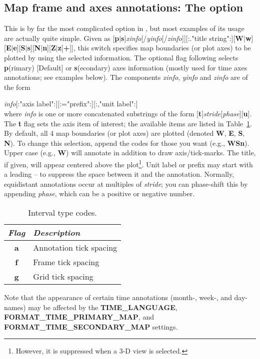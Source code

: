 \subsection{Map frame and axes annotations: The  option}
\label{sec:timeaxis}
This is by far the most complicated option in \GMT, but most examples
of its usage are actually quite simple.
Given as [\textbf{p}$|$\textbf{s}]\emph{xinfo}[/\emph{yinfo}[/\emph{zinfo}]][:."title
string":][\textbf{W}$|$\textbf{w}][\textbf{E}$|$\textbf{e}][\textbf{S}$|$\textbf{s}][\textbf{N}$|$\textbf{n}][\textbf{Z}$|$\textbf{z}[\textbf{+}]],
this switch specifies map boundaries (or plot axes) to be plotted by using the
selected information. The optional flag following  selects \textbf{p}(rimary) [Default] or \textbf{s}(econdary)
axes information (mostly used for time axes annotations; see examples below).
The components \emph{xinfo}, \emph{yinfo} and \emph{zinfo} are of the form \\

\par \emph{info}[:"axis label":][:="prefix":][:,"unit label":] \\

\noindent
where \emph{info} is one or more concatenated substrings of the form
[\textbf{t}]\emph{stride}[\emph{phase}][\textbf{u}].  The \textbf{t} flag sets the axis item of interest; the
available items are listed in Table~\ref{tbl:inttype}.  By
default, all 4 map boundaries (or plot axes) are plotted (denoted \textbf{W}, \textbf{E}, \textbf{S},
\textbf{N}).  To change this selection, append the codes for those you want
(e.g., \textbf{WSn}).  Upper case (e.g., \textbf{W}) will annotate in addition to
draw axis/tick-marks.  The title, if given, will appear centered above the plot\footnote{However,
it is suppressed when a 3-D view is selected.}.  Unit label or prefix may start with a
leading -- to suppress the space between it and the annotation.  Normally, equidistant annotations
occur at multiples of \emph{stride}; you can phase-shift this by appending \emph{phase}, which can be a
positive or negative number.
\begin{table}[H]
\centering
\begin{tabular}{|c|l|} \hline
\emph{Flag}	& \emph{Description} \\ \hline
\textbf{a}	&	Annotation tick spacing \\ \hline
\textbf{f}	&	Frame tick spacing \\ \hline
\textbf{g}	&	Grid tick spacing \\ \hline
\end{tabular}
\caption{Interval type codes.}
\label{tbl:inttype}
\end{table}
\noindent
Note that the appearance of certain time annotations (month-, week-, and day-names) may be affected
by the \textbf{TIME\_LANGUAGE}, \textbf{FORMAT\_TIME\_PRIMARY\_MAP}, and \textbf{FORMAT\_TIME\_SECONDARY\_MAP} settings.


